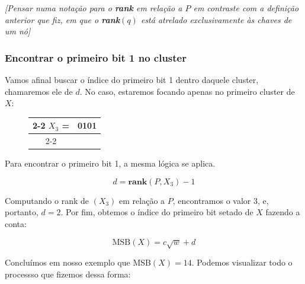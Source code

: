 \textit{[Pensar numa notação para o \textbf{rank} em relação a $P$ em contraste
com a definição anterior que fiz, em que o \textbf{rank}$(q)$ está atrelado
exclusivamente às chaves de um nó]}

\subsubsection{Encontrar o primeiro bit 1 no cluster}

Vamos afinal buscar o índice do primeiro bit 1 dentro daquele cluster,
chamaremos ele de $d$. No caso, estaremos focando apenas no primeiro cluster de
$X$:

\begin{figure}[h]
 \bf \Large\centering
 \begin{tabular}{c|c|}
\cline{2-2}
\textcolor{PineGreen}{$X_3$} = &
\textcolor{PineGreen}{0101} \\
\cline{2-2}
  \end{tabular}
\end{figure}

Para encontrar o primeiro bit 1, a mesma lógica se aplica. 

\[
d=\textbf{rank}(P,X_3)-1
\]

Computando o rank de $(X_3)$ em relação a $P$, encontramos o valor 3, e,
portanto, $d=2$. Por fim, obtemos o índice do primeiro bit setado de $X$ fazendo
a conta:

\[
\text{MSB}(X) = c\sqrt{w} + d
\]

Concluímos em nosso exemplo que MSB$(X)=14$. Podemos visualizar todo o processso
que fizemos dessa forma:

